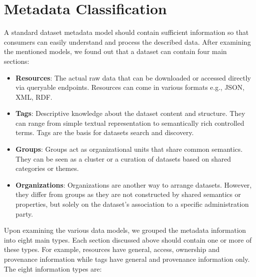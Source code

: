 \documentclass[runningheads,a4paper]{llncs}
\begin{document}

\section{Metadata Classification}
\label{sec:metadata}

A standard dataset metadata model should contain sufficient information so that consumers can easily understand and process the described data. After examining the mentioned models, we found out that a dataset can contain four main sections:

\begin{itemize}
  \item \textbf{Resources}: The actual raw data that can be downloaded or accessed directly via queryable endpoints. Resources can come in various formats e.g., JSON, XML, RDF.
  \item \textbf{Tags}:  Descriptive knowledge about the dataset content and structure. They can range from simple textual representation to semantically rich controlled terms. Tags are the basis for datasets search and discovery.
  \item \textbf{Groups}: Groups act as organizational units that share common semantics. They can be seen as a cluster or a curation of datasets based on shared categories or themes.
  \item \textbf{Organizations}: Organizations are another way to arrange datasets. However, they differ from groups as they are not constructed by shared semantics or properties, but solely on the dataset's association to a specific administration party.
\end{itemize}

Upon examining the various data models, we grouped the metadata information into eight main types. Each section discussed above should contain one or more of these types. For example, resources have general, access, ownership and provenance information while tags have general and provenance information only. The eight information types are:
\end{document}
